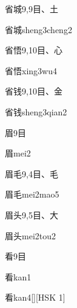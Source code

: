 \begin{entry}{省城}{9,9}{⽬、⼟}
  \begin{phonetics}{省城}{sheng3cheng2}
  \end{phonetics}
\end{entry}

\begin{entry}{省悟}{9,10}{⽬、⼼}
  \begin{phonetics}{省悟}{xing3wu4}
  \end{phonetics}
\end{entry}

\begin{entry}{省钱}{9,10}{⽬、⾦}
  \begin{phonetics}{省钱}{sheng3qian2}
  \end{phonetics}
\end{entry}

\begin{entry}{眉}{9}{⽬}
  \begin{phonetics}{眉}{mei2}
  \end{phonetics}
\end{entry}

\begin{entry}{眉毛}{9,4}{⽬、⽑}
  \begin{phonetics}{眉毛}{mei2mao5}
  \end{phonetics}
\end{entry}

\begin{entry}{眉头}{9,5}{⽬、⼤}
  \begin{phonetics}{眉头}{mei2tou2}
  \end{phonetics}
\end{entry}

\begin{entry}{看}{9}{⽬}
  \begin{phonetics}{看}{kan1}
  \end{phonetics}
  \begin{phonetics}{看}{kan4}[][HSK 1]
  \end{phonetics}
\end{entry}


